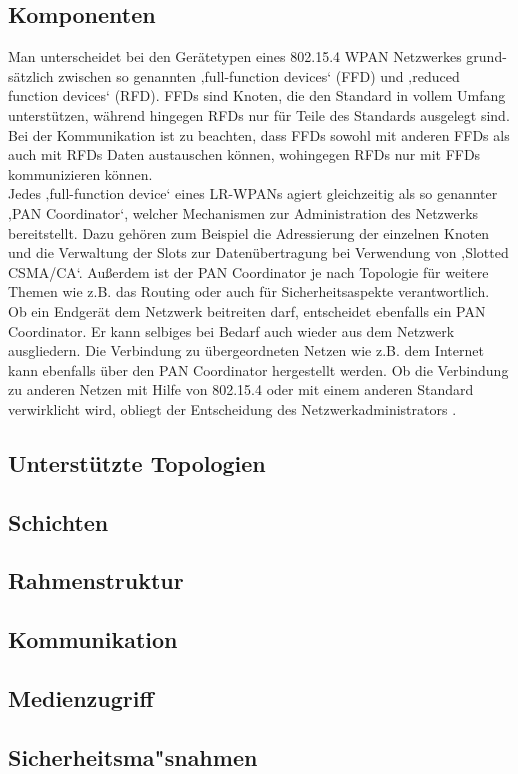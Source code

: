 \subsection{Komponenten}\label{ss:Komponenten}

Man unterscheidet bei den Gerätetypen eines 802.15.4 WPAN Netzwerkes grund-sätzlich zwischen so genannten ‚full-function devices‘ (FFD) und ‚reduced function devices‘ (RFD). FFDs sind Knoten, die den Standard in vollem Umfang unterstützen, während hingegen RFDs nur für Teile des Standards ausgelegt sind. Bei der Kommunikation ist zu beachten, dass FFDs sowohl mit anderen FFDs als auch mit RFDs Daten austauschen können, wohingegen RFDs nur mit FFDs kommunizieren können. \\
Jedes ‚full-function device‘ eines LR-WPANs agiert gleichzeitig als so genannter ‚PAN Coordinator‘, welcher Mechanismen zur Administration des Netzwerks bereitstellt. Dazu gehören zum Beispiel die Adressierung der einzelnen Knoten und die Verwaltung der Slots zur Datenübertragung bei Verwendung von ‚Slotted CSMA/CA‘. Außerdem ist der PAN Coordinator je nach Topologie für weitere Themen wie z.B. das Routing oder auch für Sicherheitsaspekte verantwortlich. \\
Ob ein Endgerät dem Netzwerk beitreiten darf, entscheidet ebenfalls ein PAN Coordinator. Er kann selbiges bei Bedarf auch wieder aus dem Netzwerk ausgliedern. Die Verbindung zu übergeordneten Netzen wie z.B. dem Internet kann ebenfalls über den PAN Coordinator hergestellt werden. Ob die Verbindung zu anderen Netzen mit Hilfe von 802.15.4 oder mit einem anderen Standard verwirklicht wird, obliegt der Entscheidung des Netzwerkadministrators \cite{d:hesse}.

\subsection{Unterstützte Topologien}\label{ss:UnterstutzeTopologien}

\subsection{Schichten}\label{ss:Schichten}

\subsection{Rahmenstruktur}\label{ss:Rahmenstruktur}

\subsection{Kommunikation}\label{ss:Kommunikation}

\subsection{Medienzugriff}\label{ss:Medienzugriff}

\subsection{Sicherheitsma"snahmen}\label{ss:Sicherheitsmassnahmen}